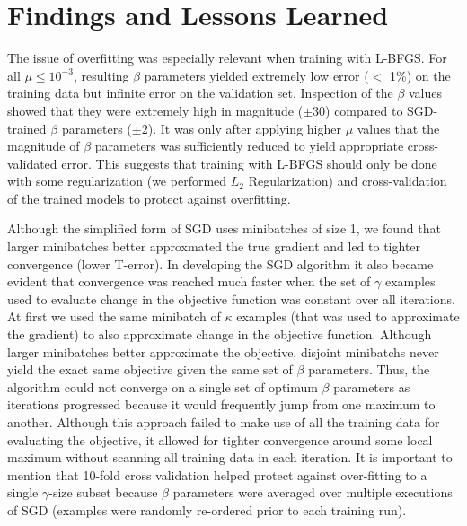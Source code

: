 \documentclass[10pt]{article}
\begin{document}
\section{Findings and Lessons Learned}
\label{sec:conclusion}

The issue of overfitting was especially relevant when training with L-BFGS. For all $\mu \leq 10^{-3}$, resulting $\beta$ parameters yielded extremely low error ($<$ 1\%) on the training data but infinite error on the validation set. Inspection of the $\beta$ values showed that they were extremely high in magnitude ($\pm 30$) compared to SGD-trained $\beta$ parameters ($\pm 2$). It was only after applying higher $\mu$ values that the magnitude of $\beta$ parameters was sufficiently reduced to yield appropriate cross-validated error. This suggests that training with L-BFGS should only be done with some regularization (we performed $L_2$ Regularization) and cross-validation of the trained models to protect against overfitting.

Although the simplified form of SGD uses minibatches of size 1, we found that larger minibatches better approxmated the true gradient and led to tighter convergence (lower T-error). In developing the SGD algorithm it also became evident that convergence was reached much faster when the set of $\gamma$ examples used to evaluate change in the objective function was constant over all iterations. At first we used the same minibatch of $\kappa$ examples (that was used to approximate the gradient) to also approximate change in the objective function. Although larger minibatches better approximate the objective, disjoint minibatchs never yield the exact same objective given the same set of $\beta$ parameters. Thus, the algorithm could not converge on a single set of optimum $\beta$ parameters as iterations progressed because it would frequently jump from one maximum to another. Although this approach failed to make use of all the training data for evaluating the objective, it allowed for tighter convergence around some local maximum without scanning all training data in each iteration. It is important to mention that 10-fold cross validation helped protect against over-fitting to a single $\gamma$-size subset because $\beta$ parameters were averaged over multiple executions of SGD (examples were randomly re-ordered prior to each training run).





\end{document}
